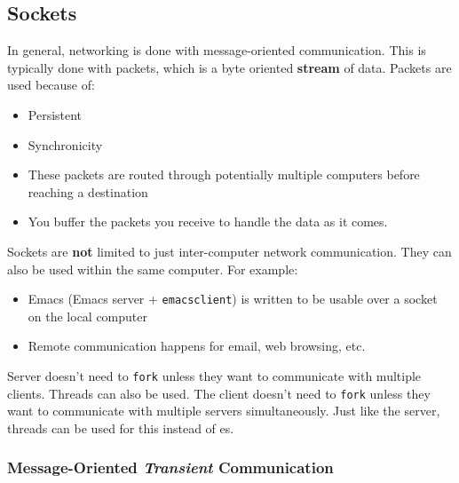 \subsection{Sockets}\label{subsec:Sockets}
In general, networking is done with message-oriented communication.
This is typically done with packets, which is a byte oriented \textbf{stream} of data.
Packets are used because of:
\begin{itemize}[noitemsep]
\item Persistent
\item Synchronicity
\item These packets are routed through potentially multiple computers before reaching a destination
\item You buffer the packets you receive to handle the data as it comes.
\end{itemize}

Sockets are \textbf{not} limited to just inter-computer network communication.
They can also be used within the same computer.
For example:
\begin{itemize}[noitemsep]
\item Emacs (Emacs server + \texttt{emacsclient}) is written to be usable over a socket on the local computer
\item Remote communication happens for email, web browsing, etc.
\end{itemize}

Server doesn't need to \texttt{fork} unless they want to communicate with multiple clients.
Threads can also be used.
The client doesn't need to \texttt{fork} unless they want to communicate with multiple servers simultaneously.
Just like the server, threads can be used for this instead of es.

\subsubsection{Message-Oriented \emph{Transient} Communication}\label{subsubsec:Transient_Communication}

